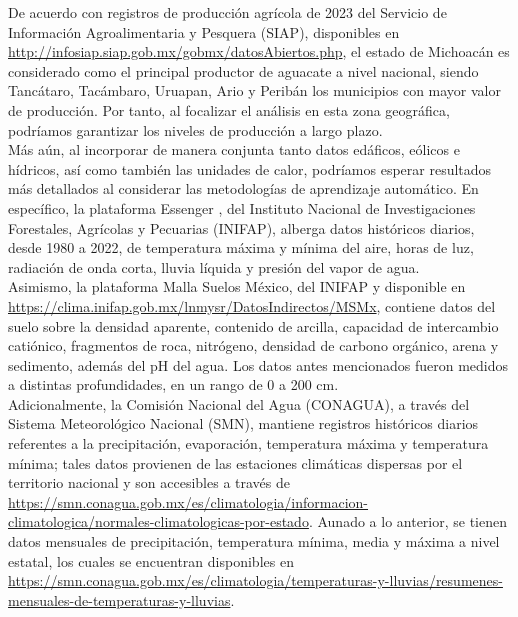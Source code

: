 




\iffalse

De acuerdo con registros de producción agrícola de 2023 del Servicio de Información Agroalimentaria y Pesquera (SIAP), disponibles en \url{http://infosiap.siap.gob.mx/gobmx/datosAbiertos.php}, el estado de Michoacán es considerado como el principal productor de aguacate a nivel nacional, siendo Tancátaro, Tacámbaro, Uruapan, Ario y Peribán los municipios con mayor valor de producción. Por tanto, al focalizar el análisis en esta zona geográfica, podríamos garantizar los niveles de producción a largo plazo.\\

Más aún, al incorporar de manera conjunta tanto datos edáficos, eólicos e hídricos, así como también las unidades de calor, podríamos esperar resultados más detallados al considerar las metodologías de aprendizaje automático. En específico, la plataforma Essenger \cite{Rodriguez-Moreno_2021}, del Instituto Nacional de Investigaciones Forestales, Agrícolas y Pecuarias (INIFAP), alberga datos históricos diarios, desde 1980 a 2022, de temperatura máxima y mínima del aire, horas de luz, radiación de onda corta, lluvia líquida y presión del vapor de agua.\\

Asimismo, la plataforma Malla Suelos México, del INIFAP y disponible en \url{https://clima.inifap.gob.mx/lnmysr/DatosIndirectos/MSMx}, contiene datos del suelo sobre la densidad aparente, contenido de arcilla, capacidad de intercambio catiónico, fragmentos de roca, nitrógeno, densidad de carbono orgánico, arena y sedimento, además del pH del agua. Los datos antes mencionados fueron medidos a distintas profundidades, en un rango de 0 a 200 cm.\\

Adicionalmente, la Comisión Nacional del Agua (CONAGUA), a través del Sistema Meteorológico Nacional (SMN), mantiene registros históricos diarios referentes a la precipitación, evaporación, temperatura máxima y temperatura mínima; tales datos provienen de las estaciones climáticas dispersas por el territorio nacional y son accesibles a través de \url{https://smn.conagua.gob.mx/es/climatologia/informacion-climatologica/normales-climatologicas-por-estado}. Aunado a lo anterior, se tienen datos mensuales de precipitación, temperatura mínima, media y máxima a nivel estatal, los cuales se encuentran disponibles en \url{https://smn.conagua.gob.mx/es/climatologia/temperaturas-y-lluvias/resumenes-mensuales-de-temperaturas-y-lluvias}.\\ 

